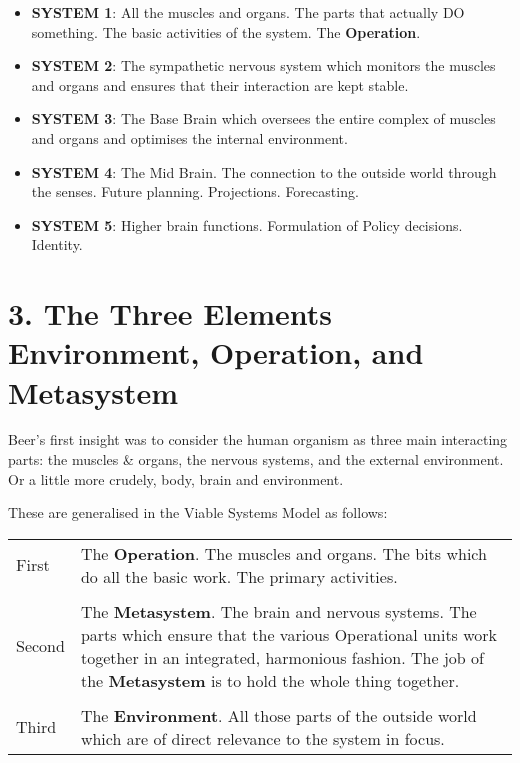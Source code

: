 \begin{itemize}
  \item \textbf{SYSTEM 1}: All the muscles and organs. The parts that actually DO something. The basic activities of the system. The \textcolor{O}{\textbf{Operation}}.

  \item \textbf{SYSTEM 2}: The sympathetic nervous system which monitors the muscles and organs and ensures that their interaction are kept stable.

  \item \textbf{SYSTEM 3}: The Base Brain which oversees the entire complex of muscles and organs and optimises the internal environment.

  \item \textbf{SYSTEM 4}: The Mid Brain. The connection to the outside world through the senses. Future planning. Projections. Forecasting.

  \item \textbf{SYSTEM 5}: Higher brain functions. Formulation of Policy decisions. Identity.

\end{itemize}

\section*{3. The Three Elements \textcolor{E}{Environment}, \textcolor{O}{Operation}, and \textcolor{M}{Metasystem}}
Beer's first insight was to consider the human organism as three main interacting parts: the muscles \& organs, the nervous systems, and the external environment. Or a little more crudely, body, brain and environment.

These are generalised in the Viable Systems Model as follows:

\begin{tabular}{  p{}  p{} }
First	&	The \textcolor{O}{\textbf{Operation}}. The muscles and organs. The bits which do all the basic work. The primary activities.\\
\\
Second	&	The \textcolor{M}{\textbf{Metasystem}}. The brain and nervous systems. The parts which ensure that the various Operational units work together in an integrated, harmonious fashion. The job of the \textcolor{M}{\textbf{Metasystem}} is to hold the whole thing together.\\
\\
Third	&	The \textcolor{E}{\textbf{Environment}}. All those parts of the outside world which are of direct relevance to the system in focus.
\end{tabular}

